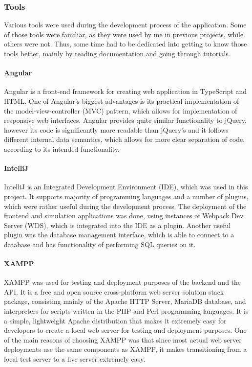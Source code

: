 \subsubsection{Tools} \label{section:tools}

Various tools were used during the development process of the application. Some of those tools were familiar, as they were used by me in previous projects, while others were not. Thus, some time had to be dedicated into getting to know those tools better, mainly by reading documentation and going through tutorials.

\paragraph{Angular}
Angular is a front-end framework for creating web application in TypeScript and HTML. One of Angular's biggest advantages is its practical implementation of the model-view-controller (MVC) pattern, which allows for implementation of responsive web interfaces. Angular provides quite similar functionality to jQuery, however its code is significantly more readable than jQuery's and it follows different internal data semantics, which allows for more clear separation of code, according to its intended functionality.

\paragraph{IntelliJ}
IntelliJ is an Integrated Development Environment (IDE), which was used in this project. It supports majority of programming languages and a number of plugins, which were rather useful during the development process. The deployment of the frontend and simulation applications was done, using instances of Webpack Dev Server (WDS), which is integrated into the IDE as a plugin. Another useful plugin was the database management interface, which is able to connect to a database and has functionality of performing SQL queries on it.

\paragraph{XAMPP}
XAMPP was used for testing and deployment purposes of the backend and the API. It is a free and open source cross-platform web server solution stack package, consisting mainly of the Apache HTTP Server, MariaDB database, and interpreters for scripts written in the PHP and Perl programming languages. It is a simple, lightweight Apache distribution that makes it extremely easy for developers to create a local web server for testing and deployment purposes. One of the main reasons of choosing XAMPP was that since most actual web server deployments use the same components as XAMPP, it makes transitioning from a local test server to a live server extremely easy.

